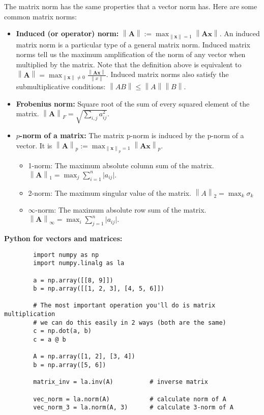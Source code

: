 \documentclass[12pt]{article}
\newcommand\norm[1]{\left\lVert#1\right\rVert}
\begin{document}
The matrix norm has the same properties that a vector norm has. Here are some common matrix norms:
    \begin{itemize}
        \item \textbf{Induced (or operator) norm:} $\displaystyle \norm{\mathbf{A}} := \max_{\norm{\mathbf{x}}=1} \norm{\mathbf{Ax}}$. An induced matrix norm is a particular type of a general matrix norm. Induced matrix norms tell us the maximum amplification of the norm of any vector when multiplied by the matrix. Note that the definition above is equivalent to $\displaystyle \norm{\mathbf{A}} = \max_{\norm{\mathbf{x}} \neq 0} \frac{\norm{\mathbf{Ax}}}{\norm{x}}$. Induced matrix norms also satisfy the submultiplicative conditions: $\norm{AB} \leq \norm{A} \norm{B}$.
        \item \textbf{Frobenius norm:} Square root of the sum of every squared element of the matrix. $\displaystyle \norm{\mathbf{A}}_F = \sqrt{\sum_{i,j} a_{ij}^2}$.
        \item \textbf{$p$-norm of a matrix:} The matrix p-norm is induced by the p-norm of a vector. It is $\displaystyle \norm{\mathbf{A}}_p := \max_{\norm{\mathbf{x}}_p=1} \norm{\mathbf{Ax}}_p$.
            \begin{itemize}
                \item 1-norm: The maximum absolute column sum of the matrix. $\displaystyle \norm{\mathbf{A}}_1 = \max_j \sum_{i=1}^n \vert a_{ij} \vert.$
                \item 2-norm: The maximum singular value of the matrix. $\displaystyle \norm{A}_{2} = \max_k \sigma_k$
                \item $\infty$-norm: The maximum absolute row sum of the matrix. $\norm{\mathbf{A}}_{\infty} = \max_i \sum_{j=1}^n \vert a_{ij} \vert.$
            \end{itemize}
    \end{itemize}

\newpage
\noindent \textbf{Python for vectors and matrices:}
    \begin{verbatim}
        import numpy as np
        import numpy.linalg as la
        
        a = np.array([[8, 9]])
        b = np.array([[1, 2, 3], [4, 5, 6]]) 
        
        # The most important operation you'll do is matrix multiplication
        # we can do this easily in 2 ways (both are the same)
        c = np.dot(a, b)
        c = a @ b
        
        A = np.array([1, 2], [3, 4])
        b = np.array([5, 6])
        
        matrix_inv = la.inv(A)          # inverse matrix
        
        vec_norm = la.norm(A)           # calculate norm of A
        vec_norm_3 = la.norm(A, 3)      # calculate 3-norm of A
        
    \end{verbatim}
\end{document}
